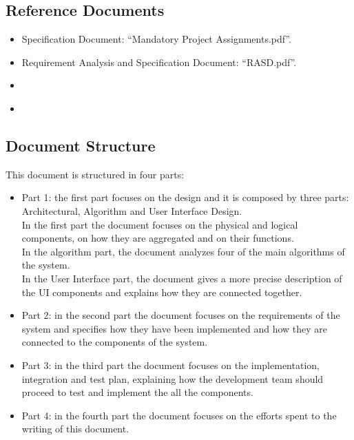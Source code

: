 \subsection{Reference Documents}
\begin{itemize}
\renewcommand\labelitemi{-}
\item
Specification Document: “Mandatory Project Assignments.pdf”.
\item
Requirement Analysis and Specification Document: “RASD.pdf”.
\item
\href{http://ieeexplore.ieee.org/document/5167255/}{\color{Black}{IEEE 1016-2009 - IEEE Standard for Information Technology--Systems Design--Software Design Descriptions.}}
\item
\href{https://www.uml-diagrams.org/}{\color{Black}{UML guide site.}}
\end{itemize}


\subsection{Document Structure}
This document is structured in four parts:
\begin{itemize}
\item
Part 1: the first part focuses on the design and it is composed by three parts: Architectural, Algorithm and User Interface Design.\\
In the first part the document focuses on the physical and logical components, on how they are aggregated and on their functions.\\
In the algorithm part, the document analyzes four of the main algorithms of the system.\\
In the User Interface part, the document gives a more precise description of the UI components and explains how they are connected together.
\item
Part 2: in the second part the document focuses on the requirements of the system and specifies how they have been implemented and how they are connected to the components of the system.
\item
Part 3: in the third part the document focuses on the implementation, integration and test plan, explaining how the development team should proceed to test and implement the all the components.
\item
Part 4: in the fourth part the document focuses on the efforts spent to the writing of this document.
\end{itemize}